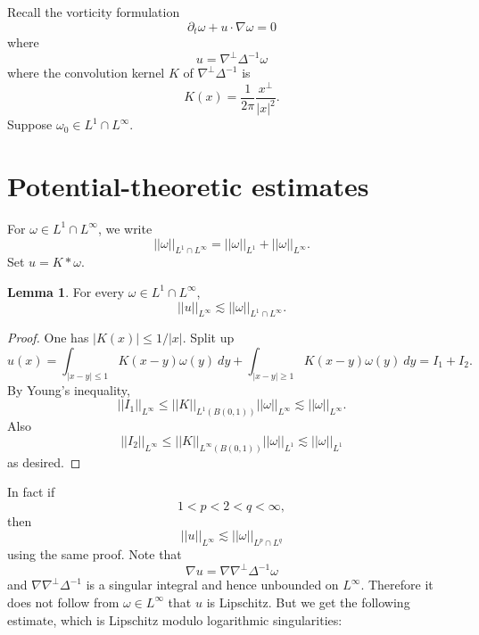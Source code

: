 \documentclass[12pt]{book}
\theoremstyle{definition}
\newtheorem{lemma}[theorem]{Lemma}
\begin{document}
Recall the vorticity formulation
$$\partial_t \omega + u \cdot \nabla \omega = 0$$
where
$$u = \nabla^\perp \Delta^{-1} \omega$$
where the convolution kernel $K$ of $\nabla^\perp \Delta^{-1}$ is
$$K(x) = \frac{1}{2\pi} \frac{x^\perp}{|x|^2}.$$
Suppose $\omega_0 \in L^1 \cap L^\infty$.

\section{Potential-theoretic estimates}
For $\omega \in L^1 \cap L^\infty$, we write
$$||\omega||_{L^1 \cap L^\infty} = ||\omega||_{L^1} + ||\omega||_{L^\infty}.$$
Set $u = K * \omega$.

\begin{lemma}
For every $\omega \in L^1 \cap L^\infty$,
$$||u||_{L^\infty} \lesssim ||\omega||_{L^1 \cap L^\infty}.$$
\end{lemma}
\begin{proof}
One has $|K(x)| \leq 1/|x|$. Split up
$$u(x) = \int_{|x - y| \leq 1} K(x - y)\omega(y) ~dy + \int_{|x - y| \geq 1} K(x - y) \omega(y) ~dy = I_1 + I_2.$$
By Young's inequality,
$$||I_1||_{L^\infty} \leq ||K||_{L^1(B(0, 1))} ||\omega||_{L^\infty} \lesssim ||\omega||_{L^\infty}.$$
Also
$$||I_2||_{L^\infty} \leq ||K||_{L^\infty(B(0, 1))} ||\omega||_{L^1} \lesssim ||\omega||_{L^1}$$
as desired.
\end{proof}
In fact if
$$1 < p < 2 < q < \infty,$$
then
$$||u||_{L^\infty} \lesssim ||\omega||_{L^p \cap L^q}$$
using the same proof.
Note that
$$\nabla u = \nabla \nabla^\perp \Delta^{-1} \omega$$
and $\nabla \nabla^\perp \Delta^{-1}$ is a singular integral and hence unbounded on $L^\infty$.
Therefore it does not follow from $\omega \in L^\infty$ that $u$ is Lipschitz.
But we get the following estimate, which is Lipschitz modulo logarithmic singularities:
\end{document}
